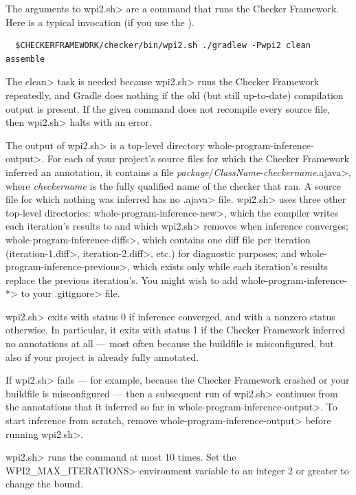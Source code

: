The arguments to \<wpi2.sh> are a command that runs the Checker Framework.
Here is a typical invocation (if you use the
).

\begin{Verbatim}
  $CHECKERFRAMEWORK/checker/bin/wpi2.sh ./gradlew -Pwpi2 clean assemble
\end{Verbatim}

\noindent
The \<clean> task is needed because \<wpi2.sh> runs the Checker Framework
repeatedly, and Gradle does nothing if the old (but still up-to-date)
compilation output is present.  If the given command does not recompile every
source file, then \<wpi2.sh> halts with an error.

The output of \<wpi2.sh> is a top-level directory
\<whole-program-inference-output>.  For each of your project's source files
for which the Checker Framework inferred an annotation, it contains a file
\<\emph{package}/\emph{ClassName}-\emph{checkername}.ajava>, where
\emph{checkername} is the fully qualified name of the checker that ran.  A
source file for which nothing was inferred has no \<.ajava> file.
\<wpi2.sh> uses three other top-level directories:
\<whole-program-inference-new>, which the compiler writes each iteration's
results to and which \<wpi2.sh> removes when inference converges;
\<whole-program-inference-diffs>, which contains one diff
file per iteration (\<iteration-1.diff>, \<iteration-2.diff>, etc.) for
diagnostic purposes; and \<whole-program-inference-previous>, which exists
only while each iteration's results replace the previous iteration's.
You might wish to add \<whole-program-inference-*> to
your \<.gitignore> file.

\<wpi2.sh> exits with status 0 if inference converged, and with a nonzero
status otherwise.  In particular, it exits with status 1 if the Checker
Framework inferred no annotations at all --- most often because the buildfile
is misconfigured, but also if your project is already fully annotated.

If \<wpi2.sh> fails --- for example, because the Checker Framework crashed
or your buildfile is misconfigured --- then a subsequent run of \<wpi2.sh>
continues from the annotations that it inferred so far in
\<whole-program-inference-output>.  To start inference from scratch, remove
\<whole-program-inference-output> before running \<wpi2.sh>.

\<wpi2.sh> runs the command at most 10 times.  Set the
\<WPI2\_MAX\_ITERATIONS> environment variable to an integer 2 or greater to
change the bound.


